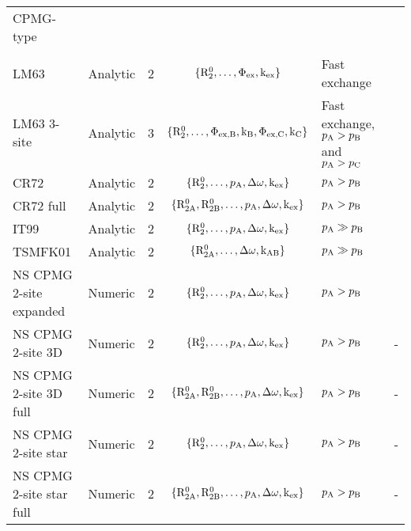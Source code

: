 \begin{sidewaystable}
\begin{center}
\begin{small}
\begin{tabular}{lllcll}
\\[-5pt]
CPMG-type \\
\cline{1-1}
\\[-5pt]
LM63                     & Analytic & 2     & $\{\mathrm{R}_2^0, \dots, \Phi_\textrm{ex}, \textrm{k}_\textrm{ex}\}$                & Fast exchange                     & \citet{LuzMeiboom63} \\
LM63 3-site              & Analytic & 3     & $\{\mathrm{R}_2^0, \dots, \Phi_\textrm{ex,B}, \textrm{k}_\textrm{B}, \Phi_\textrm{ex,C}, \textrm{k}_\textrm{C}\}$  & Fast exchange, $p_\textrm{A} > p_\textrm{B}$ and $p_\textrm{A} > p_\textrm{C}$  & \citet{LuzMeiboom63} \\
CR72                     & Analytic & 2     & $\{\mathrm{R}_2^0, \dots, p_\textrm{A}, \Delta\omega, \textrm{k}_\textrm{ex}\}$              & $p_\textrm{A} > p_\textrm{B}$                       & \citet{CarverRichards72} \\
CR72 full                & Analytic & 2     & $\{\mathrm{R}_\mathrm{2A}^0, \mathrm{R}_\mathrm{2B}^0, \dots, p_\textrm{A}, \Delta\omega, \textrm{k}_\textrm{ex}\}$ & $p_\textrm{A} > p_\textrm{B}$                       & \citet{CarverRichards72} \\
IT99                     & Analytic & 2     & $\{\mathrm{R}_2^0, \dots, p_\textrm{A}, \Delta\omega, \textrm{k}_\textrm{ex}\}$              & $p_\textrm{A} \gg p_\textrm{B}$                     & \citet{IshimaTorchia99} \\
TSMFK01                  & Analytic & 2     & $\{\mathrm{R}_\mathrm{2A}^0, \dots, \Delta\omega, \textrm{k}_\textrm{AB}\}$                  & $p_\textrm{A} \gg p_\textrm{B}$                     & \citet{Tollinger01} \\
NS CPMG 2-site expanded  & Numeric  & 2     & $\{\mathrm{R}_2^0, \dots, p_\textrm{A}, \Delta\omega, \textrm{k}_\textrm{ex}\}$              & $p_\textrm{A} > p_\textrm{B}$                       & \citet{Tollinger01} \\
NS CPMG 2-site 3D        & Numeric  & 2     & $\{\mathrm{R}_2^0, \dots, p_\textrm{A}, \Delta\omega, \textrm{k}_\textrm{ex}\}$              & $p_\textrm{A} > p_\textrm{B}$                       & - \\
NS CPMG 2-site 3D full   & Numeric  & 2     & $\{\mathrm{R}_\mathrm{2A}^0, \mathrm{R}_\mathrm{2B}^0, \dots, p_\textrm{A}, \Delta\omega, \textrm{k}_\textrm{ex}\}$ & $p_\textrm{A} > p_\textrm{B}$                       & - \\
NS CPMG 2-site star      & Numeric  & 2     & $\{\mathrm{R}_2^0, \dots, p_\textrm{A}, \Delta\omega, \textrm{k}_\textrm{ex}\}$              & $p_\textrm{A} > p_\textrm{B}$                       & - \\
NS CPMG 2-site star full & Numeric  & 2     & $\{\mathrm{R}_\mathrm{2A}^0, \mathrm{R}_\mathrm{2B}^0, \dots, p_\textrm{A}, \Delta\omega, \textrm{k}_\textrm{ex}\}$ & $p_\textrm{A} > p_\textrm{B}$                       & - \\


\end{tabular}
\end{small}
\end{center}
\end{sidewaystable}
